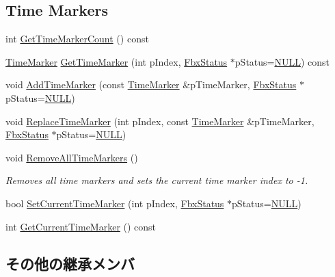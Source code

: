 \subsection*{Time Markers}
\begin{DoxyCompactItemize}
\item 
int \hyperlink{class_fbx_global_settings_ac2b055f41b43ce8fb75453d445297765}{Get\+Time\+Marker\+Count} () const
\item 
\hyperlink{struct_fbx_global_settings_1_1_time_marker}{Time\+Marker} \hyperlink{class_fbx_global_settings_a915130672bba5a01e91d88a52338f1a3}{Get\+Time\+Marker} (int p\+Index, \hyperlink{class_fbx_status}{Fbx\+Status} $\ast$p\+Status=\hyperlink{fbxarch_8h_a070d2ce7b6bb7e5c05602aa8c308d0c4}{N\+U\+LL}) const
\item 
void \hyperlink{class_fbx_global_settings_abada88146c3bbb206fd955f7674a1c85}{Add\+Time\+Marker} (const \hyperlink{struct_fbx_global_settings_1_1_time_marker}{Time\+Marker} \&p\+Time\+Marker, \hyperlink{class_fbx_status}{Fbx\+Status} $\ast$p\+Status=\hyperlink{fbxarch_8h_a070d2ce7b6bb7e5c05602aa8c308d0c4}{N\+U\+LL})
\item 
void \hyperlink{class_fbx_global_settings_a5b78d64fc99da9327f571d13f222bd8a}{Replace\+Time\+Marker} (int p\+Index, const \hyperlink{struct_fbx_global_settings_1_1_time_marker}{Time\+Marker} \&p\+Time\+Marker, \hyperlink{class_fbx_status}{Fbx\+Status} $\ast$p\+Status=\hyperlink{fbxarch_8h_a070d2ce7b6bb7e5c05602aa8c308d0c4}{N\+U\+LL})
\item 
void \hyperlink{class_fbx_global_settings_ac321c450c9dfd0897993fdcef901bf58}{Remove\+All\+Time\+Markers} ()
\begin{DoxyCompactList}\small\item\em Removes all time markers and sets the current time marker index to -\/1. \end{DoxyCompactList}\item 
bool \hyperlink{class_fbx_global_settings_a71c9d5395cf9fbc2e328fbb62c969f77}{Set\+Current\+Time\+Marker} (int p\+Index, \hyperlink{class_fbx_status}{Fbx\+Status} $\ast$p\+Status=\hyperlink{fbxarch_8h_a070d2ce7b6bb7e5c05602aa8c308d0c4}{N\+U\+LL})
\item 
int \hyperlink{class_fbx_global_settings_a9b73e19550f3df6eb83743e70a6f36d5}{Get\+Current\+Time\+Marker} () const
\end{DoxyCompactItemize}
\subsection*{その他の継承メンバ}


